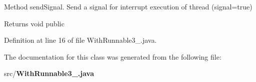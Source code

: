 Method send\+Signal. Send a signal for interrupt execution of thread (signal=true) 

\begin{DoxyReturn}{Returns}
void  public 
\end{DoxyReturn}


Definition at line 16 of file With\+Runnable3\+\_.\+java.



The documentation for this class was generated from the following file\+:\begin{DoxyCompactItemize}
\item 
src/{\bf With\+Runnable3\+\_.\+java}\end{DoxyCompactItemize}
